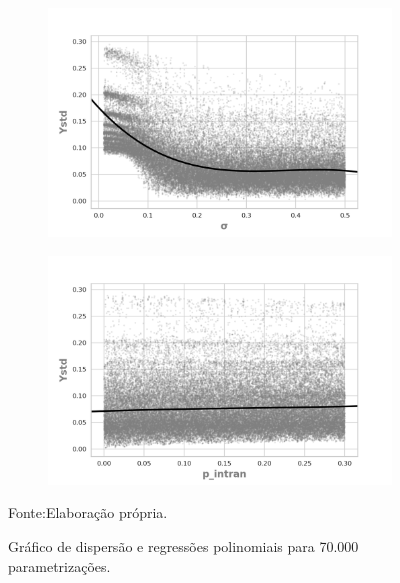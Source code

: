 \begin{figure}[H]
                \begin{subfigure}[b]{0.49\textwidth}
            \includegraphics[width=\textwidth]{ims/nlregressions/nlregressionmutatingosigma.png}
          \end{subfigure}
                \begin{subfigure}[b]{0.49\textwidth}
            \includegraphics[width=\textwidth]{ims/nlregressions/nlregressionmutatingop_intran.png}
    \end{subfigure}
    \caption{Gráfico de dispersão e regressões polinomiais para 70.000 parametrizações.}
    \label{fig:scatter2}
    Fonte:Elaboração própria.
  \end{figure}


